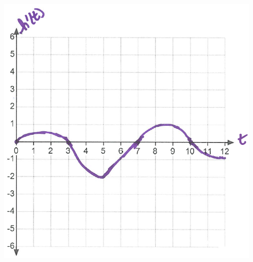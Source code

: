 \documentclass[nooutcomes,handout]{ximera}
\begin{document}
\begin{problem}
\begin{enumerate}
\begin{freeResponse}
\begin{image}
			\includegraphics[scale=.4]{Figure12.png}
			\end{image}
			\end{freeResponse}
	\end{enumerate}

\end{problem}
\end{document}
